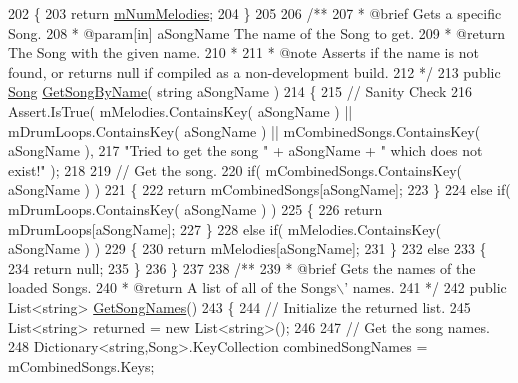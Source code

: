 \begin{DoxyCodeInclude}
202     \{
203         \textcolor{keywordflow}{return} \hyperlink{group___s_m_priv_var_ga58ea3b4f794b9e444eece384ae6e8197}{mNumMelodies};
204     \}
205 \textcolor{comment}{}
206 \textcolor{comment}{    /** }
207 \textcolor{comment}{     * @brief Gets a specific Song.}
208 \textcolor{comment}{     * @param[in] aSongName The name of the Song to get.}
209 \textcolor{comment}{     * @return The Song with the given name. }
210 \textcolor{comment}{     * }
211 \textcolor{comment}{     * @note Asserts if the name is not found, or returns null if compiled as a non-development build.}
212 \textcolor{comment}{    */}
213     \textcolor{keyword}{public} \hyperlink{class_song}{Song} \hyperlink{group___s_m_pub_func_gafe818c55bd858c52c95a2fa7a566006a}{GetSongByName}( \textcolor{keywordtype}{string} aSongName )
214     \{
215         \textcolor{comment}{// Sanity Check}
216         Assert.IsTrue( mMelodies.ContainsKey( aSongName ) || mDrumLoops.ContainsKey( aSongName ) || 
      mCombinedSongs.ContainsKey( aSongName ),
217             \textcolor{stringliteral}{"Tried to get the song "} + aSongName + \textcolor{stringliteral}{" which does not exist!"} );
218 
219         \textcolor{comment}{// Get the song.}
220         \textcolor{keywordflow}{if}( mCombinedSongs.ContainsKey( aSongName ) )
221         \{
222             \textcolor{keywordflow}{return} mCombinedSongs[aSongName];
223         \}
224         \textcolor{keywordflow}{else} \textcolor{keywordflow}{if}( mDrumLoops.ContainsKey( aSongName ) )
225         \{
226             \textcolor{keywordflow}{return} mDrumLoops[aSongName];
227         \}
228         \textcolor{keywordflow}{else} \textcolor{keywordflow}{if}( mMelodies.ContainsKey( aSongName ) )
229         \{
230             \textcolor{keywordflow}{return} mMelodies[aSongName];
231         \}
232         \textcolor{keywordflow}{else}
233         \{
234             \textcolor{keywordflow}{return} null;
235         \}
236     \}
237 \textcolor{comment}{}
238 \textcolor{comment}{    /**}
239 \textcolor{comment}{     * @brief Gets the names of the loaded Songs.}
240 \textcolor{comment}{     * @return A list of all of the Songs\(\backslash\)' names.}
241 \textcolor{comment}{    */}
242     \textcolor{keyword}{public} List<string> \hyperlink{group___s_m_pub_func_ga2a9455a763e35cfb6b242a82f7d797ae}{GetSongNames}()
243     \{
244         \textcolor{comment}{// Initialize the returned list.}
245         List<string> returned = \textcolor{keyword}{new} List<string>();
246 
247         \textcolor{comment}{// Get the song names.}
248         Dictionary<string,Song>.KeyCollection combinedSongNames = mCombinedSongs.Keys;

\end{DoxyCodeInclude}

